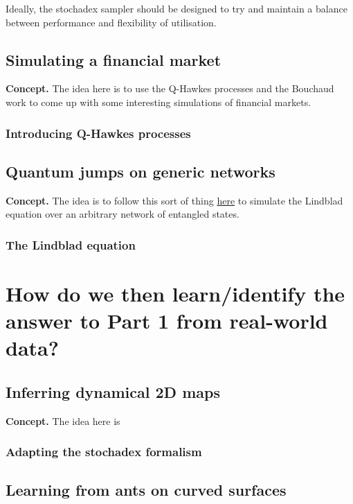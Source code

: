 \documentclass{book}
\begin{document}
Ideally, the stochadex sampler should be designed to try and maintain a balance between performance and flexibility of utilisation.


\chapter{\sffamily Simulating a financial market}

{\bfseries\sffamily Concept.} The idea here is to use the Q-Hawkes processes and the Bouchaud work to come up with some interesting simulations of financial markets. 

\section{\sffamily Introducing Q-Hawkes processes}


\chapter{\sffamily Quantum jumps on generic networks}

{\bfseries\sffamily Concept.} The idea is to follow this sort of thing \href{https://en.wikipedia.org/wiki/Quantum_jump_method}{here} to simulate the Lindblad equation over an arbitrary network of entangled states.

\section{\sffamily The Lindblad equation}


\part*{{ How do we then learn/identify the answer to Part 1 from real-world data?}}


\chapter{\sffamily Inferring dynamical 2D maps}

{\bfseries\sffamily Concept.} The idea here is 


\section{\sffamily Adapting the stochadex formalism}

\chapter{\sffamily Learning from ants on curved surfaces}
\end{document}
